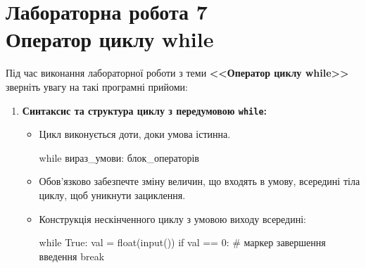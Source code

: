 \chapter{Лабораторна робота 7\\ Оператор циклу while}
Під час виконання лабораторної роботи з теми \textbf{<<Оператор циклу while>>} зверніть увагу на такі програмні прийоми:

\begin{enumerate}[label=\arabic*.]
	\item \textbf{Синтаксис та структура циклу з передумовою \texttt{while}:}
	
	
	
	\begin{itemize}
		\item Цикл виконується доти, доки умова істинна.
		
\begin{py}{}
while вираз_умови:
    блок_операторів
\end{py}
		
		\item Обов'язково забезпечте зміну величин, що входять в умову, всередині тіла циклу, щоб уникнути зациклення.
		\item Конструкція нескінченного циклу з умовою виходу всередині:
\begin{py}{}
while True:
    val = float(input())
    if val == 0:  # маркер завершення введення
        break
\end{py}
	\end{itemize}
\end{enumerate}	
\bigskip


